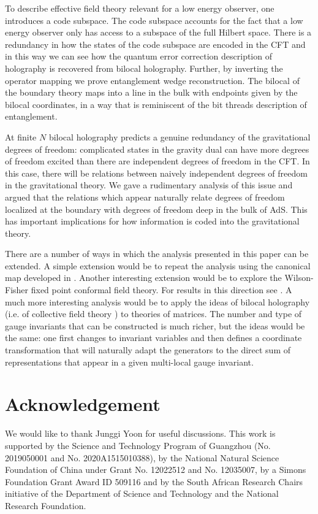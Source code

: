 \documentclass[a4paper,12pt]{article}
\begin{document}
To describe effective field theory relevant for a low energy observer, one introduces a code subspace.
The code subspace accounts for the fact that a low energy observer only has access to a subspace of the full Hilbert space.
There is a redundancy in how the states of the code subspace are encoded in the CFT and in this way we can see how the
quantum error correction description of holography is recovered from bilocal holography.
Further, by inverting the operator mapping we prove entanglement wedge reconstruction.
The bilocal of the boundary theory maps into a line in the bulk with endpoints given by the bilocal coordinates, in a
way that is reminiscent of the bit threads description of entanglement.

At finite $N$ bilocal holography predicts a genuine redundancy of the gravitational degrees of freedom: complicated
states in the gravity dual can have more degrees of freedom excited than there are independent degrees of freedom in the
CFT. In this case, there will be relations between naively independent degrees of freedom in the gravitational theory.
We gave a rudimentary analysis of this issue and argued that the relations which appear naturally relate degrees of 
freedom localized at the boundary with degrees of freedom deep in the bulk of AdS.
This has important implications for how information is coded into the gravitational theory.

There are a number of ways in which the analysis presented in this paper can be extended.
A simple extension would be to repeat the analysis using the canonical map developed in \cite{Koch:2014aqa}.
Another interesting extension would be to explore the Wilson-Fisher fixed point conformal field theory.
For results in this direction see \cite{Mulokwe:2018czu}.
A much more interesting analysis would be to apply the ideas of bilocal holography (i.e. of collective field 
theory \cite{Jevicki:1979mb,Jevicki:1980zg}) to theories of matrices.
The number and type of gauge invariants that can be constructed is much richer, but the ideas would be the same: one
first changes to invariant variables and then defines a coordinate transformation that will naturally adapt the generators
to the direct sum of representations that appear in a given multi-local gauge invariant.

\section*{Acknowledgement}
We would like to thank Junggi Yoon for useful discussions. 
This work is supported by the Science and Technology Program of Guangzhou (No. 2019050001 and
No. 2020A1515010388), by the National Natural Science Foundation of China under Grant No. 12022512 and No. 12035007,
by a Simons Foundation Grant Award ID 509116 and by the South African Research Chairs initiative 
of the Department of Science and Technology and the National Research Foundation.
\end{document}
